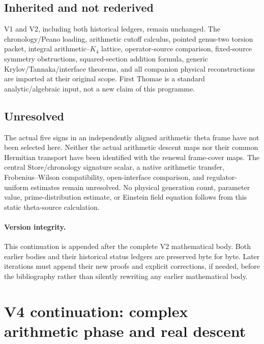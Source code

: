 \documentclass[11pt]{article}
\theoremstyle{definition}
\theoremstyle{remark}
\begin{document}
\subsection{Inherited and not rederived}
V1 and V2, including both historical ledgers, remain unchanged. The
chronology/Peano loading, arithmetic cutoff calculus, pointed genus-two
torsion packet, integral arithmetic--$K_4$ lattice, operator-source
comparison, fixed-source symmetry obstructions, squared-section addition
formula, generic Krylov/Tannaka/interface theorems, and all companion
physical reconstructions are imported at their original scope. First
Thomae is a standard analytic/algebraic input, not a new claim of this
programme.

\subsection{Unresolved}
The actual five signs in an independently aligned arithmetic theta frame
have not been selected here. Neither the actual arithmetic descent maps nor
their common Hermitian transport have been identified with the renewal
frame-cover maps. The central Store/chronology signature scalar, a native
arithmetic transfer, Frobenius--Wilson compatibility, open-interface
comparison, and regulator-uniform estimates remain unresolved. No physical
generation count, parameter value, prime-distribution estimate, or Einstein
field equation follows from this static theta-source calculation.

\paragraph{Version integrity.}
This continuation is appended after the complete V2 mathematical body.
Both earlier bodies and their historical status ledgers are preserved
byte for byte. Later iterations must append their new proofs and explicit
corrections, if needed, before the bibliography rather than silently
rewriting any earlier mathematical body.


\section{V4 continuation: complex arithmetic phase and real descent}
\label{sec:v4-context}
\end{document}
